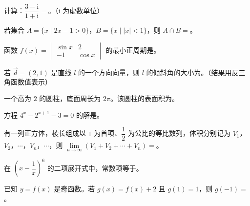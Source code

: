 

\begin{question}
计算：$\dfrac{3-\mathrm i}{1+\mathrm i}=$\gkblank{}。（$\mathrm i$ 为虚数单位）

\end{question}
\begin{question}
若集合 $A=\{x\mid2x-1>0\}$，$B=\{x\mid|x|<1\}$，则 $A\cap B=$\gkblank{}。

\end{question}
\begin{question}
函数 $f(x)=\begin{vmatrix}\sin x&2\\ -1&\cos x\end{vmatrix}$ 的最小正周期是\gkblank{}。

\end{question}
\begin{question}
若 $\overrightarrow d=(2,1)$ 是直线 $l$ 的一个方向向量，则 $l$ 的倾斜角的大小为\gkblank{}。（结果用反三角函数值表示）

\end{question}
\begin{question}
一个高为 $2$ 的圆柱，底面周长为 $2\pi$。该圆柱的表面积为\gkblank{}。

\end{question}
\begin{question}
方程 $4^x-2^{x+1}-3=0$ 的解是\gkblank{}。

\end{question}
\begin{question}
有一列正方体，棱长组成以 $1$ 为首项、$\dfrac12$ 为公比的等比数列，体积分别记为 $V_1$，$V_2$，$\cdots$，$V_n$，$\cdots$，则 $\lim\limits_{n\to\infty}(V_1+V_2+\cdots+V_n)=$\gkblank{}。

\end{question}
\begin{question}
在 $\left(x-\dfrac1x\right)^6$ 的二项展开式中，常数项等于\gkblank{}。

\end{question}
\begin{question}
已知 $y=f(x)$ 是奇函数。若 $g(x)=f(x)+2$ 且 $g(1)=1$，则 $g(-1)=$\gkblank{}。

\end{question}
